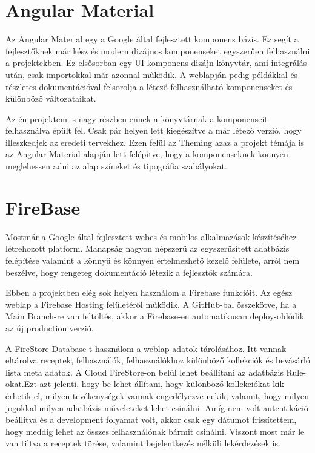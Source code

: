 \documentclass[12pt]{report}
\theoremstyle{definition}
\begin{document}
\section{Angular Material}
Az Angular Material egy a Google által fejlesztett komponens bázis. Ez segít a fejlesztőknek már kész és modern dizájnos komponenseket egyszerűen felhasználni a projektekben. Ez elsősorban egy UI komponens dizájn könyvtár, ami integrálás után, csak importokkal már azonnal működik. A weblapján pedig példákkal és részletes dokumentációval felsorolja a létező felhasználható komponenseket és különböző változataikat.

Az én projektem is nagy részben ennek a könyvtárnak a komponenseit felhasználva épült fel. Csak pár helyen lett kiegészítve a már létező verzió, hogy illeszkedjek az eredeti tervekhez. Ezen felül az Theming azaz a projekt témája is az Angular Material alapján lett felépítve, hogy a komponenseknek könnyen meglehessen adni az alap színeket és tipográfia szabályokat.

\section{FireBase}
Mostmár a Google által fejlesztett webes és mobilos alkalmazások készítéséhez létrehozott platform. Manapság nagyon népszerű az egyszerűsített adatbázis felépítése valamint a könnyű és könnyen értelmezhető kezelő felülete, arról nem beszélve, hogy rengeteg dokumentáció létezik a fejlesztők számára.

Ebben a projektben elég sok helyen használom a Firebase funkcióit. Az egész weblap a Firebase Hosting felületéről működik. A GitHub-bal összekötve, ha a Main Branch-re van feltöltés, akkor a Firebase-en automatikusan deploy-oldódik az új production verzió.

A FireStore Database-t használom a weblap adatok tárolásához. Itt vannak eltárolva  receptek, felhasználók, felhasználókhoz különböző kollekciók és bevásárló lista meta adatok. A Cloud FireStore-on belül lehet beállítani az adatbázis Rule-okat.Ezt azt jelenti, hogy be lehet állítani, hogy különböző kollekciókat kik érhetik el, milyen tevékenységek vannak engedélyezve nekik, valamit, hogy milyen jogokkal milyen adatbázis műveleteket lehet csinálni. Amíg nem volt autentikáció beállítva és a development folyamat volt, akkor csak egy dátumot frissítettem, hogy meddig lehet az összes felhasználónak bármit csinálni. Viszont most már le van tiltva a receptek törése, valamint bejelentkezés nélküli lekérdezések is.
\end{document}
